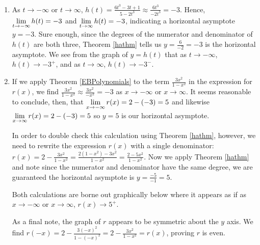 \begin{ex}
\begin{enumerate}
\begin{center}
\begin{tabular}{cc}
\end{tabular}
\end{center} 

\item   As $t \rightarrow -\infty$ or $t \rightarrow \infty$,  $h(t) = \frac{6t^3-3t+1}{5-2t^3} \approx  \frac{6t^3}{-2t^3} = -3$.  Hence, $\ds{\lim_{t \rightarrow  -\infty} h(t) = -3}$ and $\ds{\lim_{t \rightarrow  \infty} h(t) = -3}$, indicating a horizontal asymptote $y = -3$.  Sure enough, since the degrees of the numerator and denominator of $h(t)$ are both three,  Theorem \ref{hathm} tells us $y = \frac{6}{-2} = -3$ is the horizontal asymptote.  We see from the graph of $y = h(t)$ that as $t \rightarrow -\infty$, $h(t) \rightarrow -3^{+}$, and as $t \rightarrow \infty$, $h(t) \rightarrow -3^{-}$.

\item  If we apply Theorem \ref{EBPolynomials} to the term  $\frac{3x^2}{1-x^2}$ in the expression for $r(x)$, we find   $\frac{3x^2}{1-x^2} \approx \frac{3x^2}{-x^2} = -3$ as $x \rightarrow -\infty$ or $x \rightarrow \infty$.  It  seems reasonable to conclude, then, that  $\ds{\lim_{x \rightarrow  -\infty} r(x) = 2 - (-3) = 5}$ and likewise $\ds{\lim_{x \rightarrow  \infty} r(x) = 2 - (-3) = 5}$ so $y = 5$ is our horizontal asymptote. 

 In order to double check this calculation using  Theorem \ref{hathm}, however, we need to rewrite the expression $r(x)$ with a single denominator:  $r(x) = 2 - \frac{3x^2}{1-x^2} = \frac{2(1-x^2) - 3x^2}{1-x^2} = \frac{2-5x^2}{1-x^2}$.  Now we apply Theorem \ref{hathm}  and note since the numerator and denominator have the same degree, we are guaranteed the horizontal asymptote is $y = \frac{-5}{-1} = 5$.  
 
Both  calculations are borne out graphically below where it appears as if as $x \rightarrow  -\infty$ or $x \rightarrow \infty$, $r(x) \rightarrow 5^{+}$. 

 As a final note, the graph of $r$ appears to be symmetric about the $y$ axis.  We find $r(-x) = 2 - \frac{3(-x)^2}{1-(-x)^2} = 2 - \frac{3x^2}{1-x^2} = r(x)$, proving $r$ is even.

\begin{center}
\begin{tabular}{cc}


\end{tabular}
\end{center}
\end{enumerate}
\end{ex}
